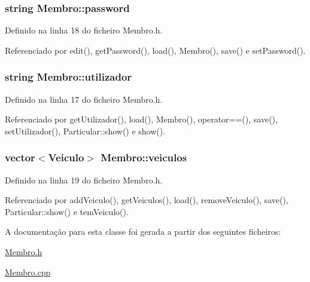 \hypertarget{class_membro_ae2b12fc3e91efc674c07e735edf4ac21}{
\subsubsection[{password}]{\setlength{\rightskip}{0pt plus 5cm}string Membro\+::password\hspace{0.3cm}{\ttfamily [protected]}}}\label{class_membro_ae2b12fc3e91efc674c07e735edf4ac21}


Definido na linha 18 do ficheiro Membro.\+h.



Referenciado por edit(), get\+Password(), load(), Membro(), save() e set\+Password().

\hypertarget{class_membro_a42cc733ff94ec8d1bbfdacc62dfbb0e7}{
\subsubsection[{utilizador}]{\setlength{\rightskip}{0pt plus 5cm}string Membro\+::utilizador\hspace{0.3cm}{\ttfamily [protected]}}}\label{class_membro_a42cc733ff94ec8d1bbfdacc62dfbb0e7}


Definido na linha 17 do ficheiro Membro.\+h.



Referenciado por get\+Utilizador(), load(), Membro(), operator==(), save(), set\+Utilizador(), Particular\+::show() e show().

\hypertarget{class_membro_a7485fc8a9f992a05662866f19b22f74a}{
\subsubsection[{veiculos}]{\setlength{\rightskip}{0pt plus 5cm}vector$<${\bf Veiculo}$>$ Membro\+::veiculos\hspace{0.3cm}{\ttfamily [protected]}}}\label{class_membro_a7485fc8a9f992a05662866f19b22f74a}


Definido na linha 19 do ficheiro Membro.\+h.



Referenciado por add\+Veiculo(), get\+Veiculos(), load(), remove\+Veiculo(), save(), Particular\+::show() e tem\+Veiculo().



A documentação para esta classe foi gerada a partir dos seguintes ficheiros\+:\begin{DoxyCompactItemize}
\item 
\hyperlink{_membro_8h}{Membro.\+h}\item 
\hyperlink{_membro_8cpp}{Membro.\+cpp}\end{DoxyCompactItemize}
